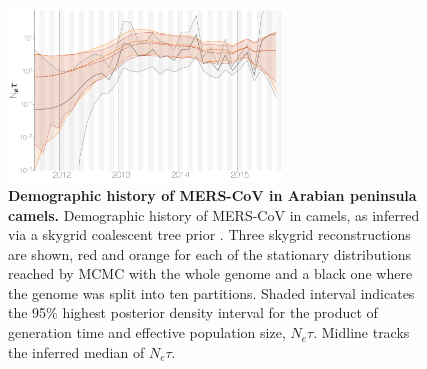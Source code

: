 \documentclass[9pt,lineno]{elife}
\begin{document}
\begin{figure}[h]
\centering
	\includegraphics[width=0.65\textwidth]{figures/figure 5.png}
	\caption{\textbf{Demographic history of MERS-CoV in Arabian peninsula camels.}
Demographic history of MERS-CoV in camels, as inferred via a skygrid coalescent tree prior \citep{gill_2013}.
Three skygrid reconstructions are shown, red and orange for each of the stationary distributions reached by MCMC with the whole genome and a black one where the genome was split into ten partitions.
Shaded interval indicates the 95\% highest posterior density interval for the product of generation time and effective population size, $N_{e}\tau$.
Midline tracks the inferred median of $N_{e}\tau$.
	}
	\label{skygrid}

\end{figure}
\end{document}
